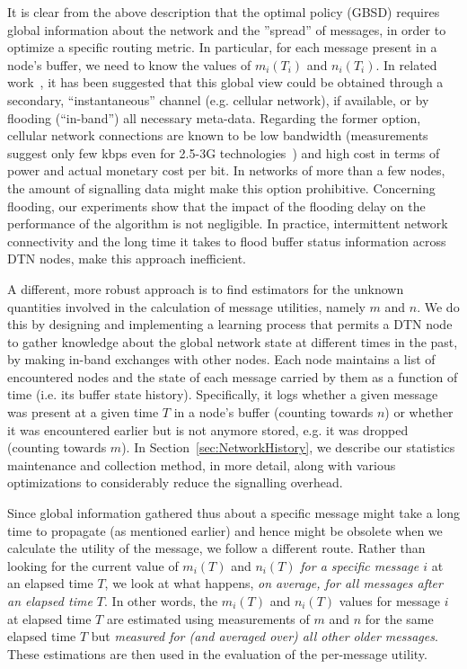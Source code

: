 It is clear from the above description that the optimal policy (GBSD) requires global information about the network and the ''spread'' of messages, in order to optimize a specific routing metric. In particular, for each message present in a node's buffer, we need to know the values of $m_i(T_i)$ and $n_i(T_i)$. In related work~\cite{Levine:Sigcomm07}, it has been suggested that this global view could be obtained through a secondary, ``instantaneous'' channel (e.g. cellular network), if available, or by flooding (``in-band'') all necessary meta-data. Regarding the former option, cellular network connections are known to be low bandwidth (measurements suggest only few kbps even for 2.5-3G technologies~\cite{Keshav:multi-nic}) and high cost in terms of power and actual monetary cost per bit. In networks of more than a few nodes, the amount of signalling data might make this option prohibitive. Concerning flooding, our experiments show that the impact of the flooding delay on the performance of the algorithm is not negligible. In practice, intermittent network connectivity and the long time it takes to flood buffer status information across DTN nodes, make this approach inefficient.

A different, more robust approach is to find estimators for the unknown quantities involved in the calculation of message utilities, namely $m$ and $n$. We do this by designing and implementing a learning process that permits a DTN node to gather knowledge about the global network state at different times in the past, by making in-band exchanges with other nodes. Each node maintains a list of encountered nodes and the state of each message carried by them as a function of time (i.e. its buffer state history). Specifically, it logs whether a given message was present at a given time $T$ in a node's buffer (counting towards $n$) or whether it was encountered earlier but is not anymore stored, e.g. it was dropped (counting towards $m$). In Section~\ref{sec:NetworkHistory}, we describe our statistics maintenance and collection method, in more detail, along with various optimizations to considerably reduce the signalling overhead.

Since global information gathered thus about a specific message might take a long time to propagate (as mentioned earlier) and hence might be obsolete when we calculate the utility of the message, we follow a different route. Rather than looking for the current value of $m_{i}(T)$ and $n_{i}(T)$ \emph{for a specific message $i$} at an elapsed time $T$, we look at what happens, \emph{on average, for all messages after an elapsed time $T$}. In other words, the $m_i(T)$ and $n_i(T)$ values for message $i$ at elapsed time $T$ are estimated using measurements of $m$ and $n$ for the same elapsed time $T$ but \emph{measured for (and averaged over) all other older messages}. These estimations are then used in the evaluation of the per-message utility.

